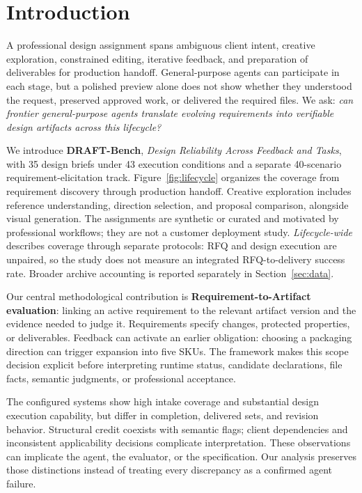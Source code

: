 \section{Introduction}
A professional design assignment spans ambiguous client intent, creative exploration, constrained editing, iterative feedback, and preparation of deliverables for production handoff. General-purpose agents can participate in each stage, but a polished preview alone does not show whether they understood the request, preserved approved work, or delivered the required files. We ask: \emph{can frontier general-purpose agents translate evolving requirements into verifiable design artifacts across this lifecycle?}

We introduce \textbf{DRAFT-Bench}, \emph{Design Reliability Across Feedback and Tasks}, with 35 design briefs under 43 execution conditions and a separate 40-scenario requirement-elicitation track. Figure~\ref{fig:lifecycle} organizes the coverage from requirement discovery through production handoff. Creative exploration includes reference understanding, direction selection, and proposal comparison, alongside visual generation. The assignments are synthetic or curated and motivated by professional workflows; they are not a customer deployment study. \emph{Lifecycle-wide} describes coverage through separate protocols: RFQ and design execution are unpaired, so the study does not measure an integrated RFQ-to-delivery success rate. Broader archive accounting is reported separately in Section~\ref{sec:data}.

Our central methodological contribution is \textbf{Requirement-to-Artifact evaluation}: linking an active requirement to the relevant artifact version and the evidence needed to judge it. Requirements specify changes, protected properties, or deliverables. Feedback can activate an earlier obligation: choosing a packaging direction can trigger expansion into five SKUs. The framework makes this scope decision explicit before interpreting runtime status, candidate declarations, file facts, semantic judgments, or professional acceptance.

The configured systems show high intake coverage and substantial design execution capability, but differ in completion, delivered sets, and revision behavior. Structural credit coexists with semantic flags; client dependencies and inconsistent applicability decisions complicate interpretation. These observations can implicate the agent, the evaluator, or the specification. Our analysis preserves those distinctions instead of treating every discrepancy as a confirmed agent failure.

